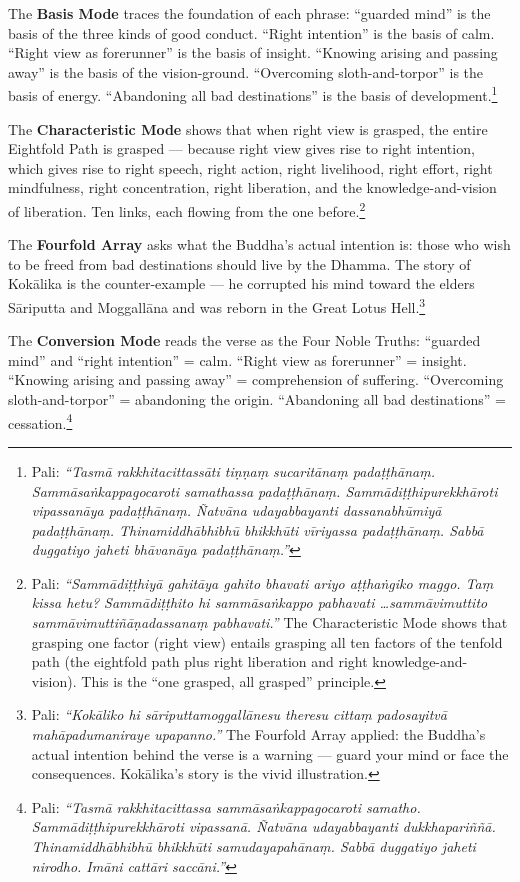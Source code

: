The \textbf{Basis Mode} traces the foundation of each phrase: ``guarded mind'' is the basis of the three kinds of good conduct. ``Right intention'' is the basis of calm. ``Right view as forerunner'' is the basis of insight. ``Knowing arising and passing away'' is the basis of the vision-ground. ``Overcoming sloth-and-torpor'' is the basis of energy. ``Abandoning all bad destinations'' is the basis of development.\footnote{Pali: \textit{``Tasmā rakkhitacittassāti tiṇṇaṃ sucaritānaṃ padaṭṭhānaṃ. Sammāsaṅkappagocaroti samathassa padaṭṭhānaṃ. Sammādiṭṭhipurekkhāroti vipassanāya padaṭṭhānaṃ. Ñatvāna udayabbayanti dassanabhūmiyā padaṭṭhānaṃ. Thinamiddhābhibhū bhikkhūti vīriyassa padaṭṭhānaṃ. Sabbā duggatiyo jaheti bhāvanāya padaṭṭhānaṃ.''}}

The \textbf{Characteristic Mode} shows that when right view is grasped, the entire Eightfold Path is grasped --- because right view gives rise to right intention, which gives rise to right speech, right action, right livelihood, right effort, right mindfulness, right concentration, right liberation, and the knowledge-and-vision of liberation. Ten links, each flowing from the one before.\footnote{Pali: \textit{``Sammādiṭṭhiyā gahitāya gahito bhavati ariyo aṭṭhaṅgiko maggo. Taṃ kissa hetu? Sammādiṭṭhito hi sammāsaṅkappo pabhavati \ldots sammāvimuttito sammāvimuttiñāṇadassanaṃ pabhavati.''} The Characteristic Mode shows that grasping one factor (right view) entails grasping all ten factors of the tenfold path (the eightfold path plus right liberation and right knowledge-and-vision). This is the ``one grasped, all grasped'' principle.}

The \textbf{Fourfold Array} asks what the Buddha's actual intention is: those who wish to be freed from bad destinations should live by the Dhamma. The story of Kokālika is the counter-example --- he corrupted his mind toward the elders Sāriputta and Moggallāna and was reborn in the Great Lotus Hell.\footnote{Pali: \textit{``Kokāliko hi sāriputtamoggallānesu theresu cittaṃ padosayitvā mahāpadumaniraye upapanno.''} The Fourfold Array applied: the Buddha's actual intention behind the verse is a warning --- guard your mind or face the consequences. Kokālika's story is the vivid illustration.}

The \textbf{Conversion Mode} reads the verse as the Four Noble Truths: ``guarded mind'' and ``right intention'' = calm. ``Right view as forerunner'' = insight. ``Knowing arising and passing away'' = comprehension of suffering. ``Overcoming sloth-and-torpor'' = abandoning the origin. ``Abandoning all bad destinations'' = cessation.\footnote{Pali: \textit{``Tasmā rakkhitacittassa sammāsaṅkappagocaroti samatho. Sammādiṭṭhipurekkhāroti vipassanā. Ñatvāna udayabbayanti dukkhapariññā. Thinamiddhābhibhū bhikkhūti samudayapahānaṃ. Sabbā duggatiyo jaheti nirodho. Imāni cattāri saccāni.''}}

